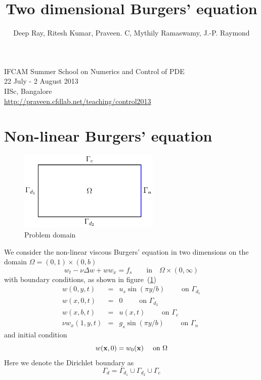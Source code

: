\documentclass[12pt]{article}
\title{Two dimensional Burgers' equation}
\author{Deep Ray, Ritesh Kumar, Praveen. C, Mythily Ramaswamy, J.-P. Raymond}
\date{}
\begin{document}
\maketitle
\begin{center}
IFCAM Summer School on Numerics and Control of PDE\\
22 July - 2 August 2013\\
IISc, Bangalore\\
\url{http://praveen.cfdlab.net/teaching/control2013}
\end{center}


\section{Non-linear Burgers' equation}
\begin{figure}[h]
\begin{center}
\includegraphics[width=0.6\textwidth]{burger2d_domain}
\caption{Problem domain}
\label{fig:domain}
\end{center}
\end{figure}
We consider the non-linear viscous Burgers' equation in two dimensions on the domain $\Omega = (0,1) \times (0,b)$
\begin{equation*}
w_t -\nu \Delta w + w w_{x} = f_s \qquad \mbox{in} \quad \Omega \times (0,\infty)
\end{equation*}
with boundary conditions, as shown in figure~(\ref{fig:domain})
\begin{eqnarray*}
w(0,y,t) &=& u_s \sin(\pi y/b) \qquad \mbox{ on } \Gamma_{d_1} \\
w(x,0,t) &=& 0 \qquad \mbox{ on } \Gamma_{d_2} \\
w(x,b,t) &=& u(x,t) \qquad \mbox{ on } \Gamma_c \\
\nu w_x(1,y,t) &=& g_s \sin(\pi y/b) \qquad \mbox{ on } \Gamma_n
\end{eqnarray*}
and initial condition
\begin{equation*}
w({\mathbf x},0) = w_0({\mathbf x}) \quad \text{ on } \Omega
\end{equation*}
Here we denote the Dirichlet boundary as
\[
 \Gamma_d = \Gamma_{d_1} \cup \Gamma_{d_2} \cup \Gamma_c
\]
\end{document}
